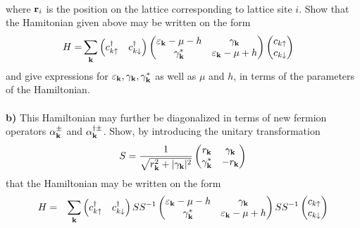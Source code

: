 \begin{problem}
\begin{eqnarray}
	\end{eqnarray}
	where ${\bf r}_i$ is the position on the lattice corresponding to lattice site $i$. Show that the Hamitonian given above may be written on the form
	\begin{align}
		\begin{split}
			H =&   \sum_{{\bf k}} 
			\begin{pmatrix} c_{k\uparrow}^\dagger & c_{k \downarrow}^\dagger  \end{pmatrix}
			\begin{pmatrix} \varepsilon_{{\bf k}}-\mu - h & \gamma_{{\bf k}} \\ \gamma_{{\bf k}}^{*} & \varepsilon_{{\bf k}} - \mu + h \end{pmatrix}  
			\begin{pmatrix} c_{k \uparrow} \\ c_{ k\downarrow}  \end{pmatrix}
		\end{split} \nonumber 
	\end{align}
	and give expressions for $\varepsilon_{{\bf k}}, \gamma_{{\bf k}}, \gamma_{{\bf k}}^{*}$ as well as $\mu$ and $h$, in terms of the parameters of the Hamiltonian.  
	\ \\
	\ \\
	{\bf b)} This Hamiltonian may further be diagonalized in terms of new fermion operators $\alpha^{\pm}_{{\bf k}}$ and $\alpha^{\dagger \pm}_{{\bf k}}$. Show, by introducing the unitary transformation
	\begin{eqnarray}
		S = \frac{1}{\sqrt{r_{{\bf k}}^2  + | \gamma_{{\bf k}} |^2}}\begin{pmatrix} r_{{\bf k}} & \gamma_{{\bf k}} \\ \gamma_{{\bf k}}^{*} & -r_{{\bf k}} \end{pmatrix}  \nonumber 
	\end{eqnarray}
	that the Hamiltonian may be written on the form
	\begin{eqnarray}
		H & =&   \sum_{{\bf k}} 
		\begin{pmatrix} c_{k\uparrow}^\dagger & c_{k \downarrow}^\dagger  \end{pmatrix} S S^{-1}
		\begin{pmatrix} \varepsilon_{{\bf k}}-\mu - h & \gamma_{{\bf k}} \\ \gamma_{{\bf k}}^{*} & \varepsilon_{{\bf k}} - \mu + h \end{pmatrix}   S S^{-1}
		\begin{pmatrix} c_{k \uparrow} \\ c_{ k\downarrow}  \end{pmatrix} \nonumber \\

\end{eqnarray}
\end{problem}
